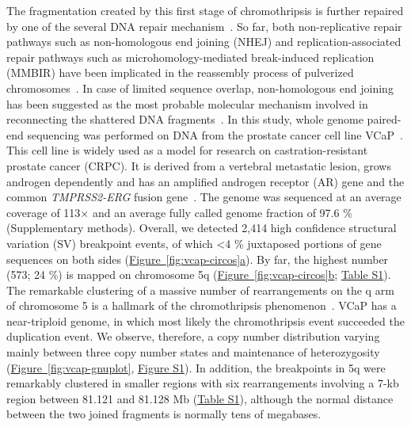 The fragmentation created by this first stage of chromothripsis is further repaired by one of the several DNA repair mechanism~\cite{holland2012chromoanagenesis}.
So far, both non-replicative repair pathways such as non-homologous end joining (NHEJ) and replication-associated repair pathways such as microhomology-mediated
break-induced replication (MMBIR) have been implicated in the reassembly process of pulverized chromosomes~\cite{forment2012chromothripsis}. In case of limited sequence
overlap, non-homologous end joining has been suggested as the most probable molecular mechanism involved in reconnecting the shattered DNA fragments~\cite{rausch2012genome}.
In this study, whole genome paired-end sequencing was performed on DNA from the prostate cancer cell line VCaP~\cite{drmanac2010human}. This cell line is widely
used as a model for research on castration-resistant prostate cancer (CRPC). It is derived from a vertebral metastatic lesion, grows androgen dependently and
has an amplified androgen receptor (AR) gene and the common \textit{TMPRSS2-ERG} fusion gene~\cite{korenchuk2001vcap}. The genome was sequenced at an average coverage
of 113× and an average fully called genome fraction of 97.6 \% (Supplementary methods). Overall, we detected 2,414 high confidence structural variation (SV)
breakpoint events, of which <4 \% juxtaposed portions of gene sequences on both sides (\hyperref[fig:vcap-circos]{Figure~\ref*{fig:vcap-circos}a}). By far, the highest number (573; 24 \%) is
 mapped on chromosome 5q (\hyperref[fig:vcap-circos]{Figure~\ref*{fig:vcap-circos}b}; \href{https://link.springer.com/article/10.1007/s00439-013-1308-1#SupplementaryMaterial}{Table S1}). The remarkable clustering of a massive number of rearrangements on the q arm of chromosome 5 is
a hallmark of the chromothripsis phenomenon~\cite{forment2012chromothripsis}. VCaP has a near-triploid genome, in which most likely the chromothripsis event succeeded
the duplication event. We observe, therefore, a copy number distribution varying mainly between three copy number states and maintenance of heterozygosity
(\hyperref[vcap-gnuplot]{Figure~\ref*{fig:vcap-gnuplot}}, \href{https://link.springer.com/article/10.1007/s00439-013-1308-1#SupplementaryMaterial}{Figure S1}). In addition, the breakpoints in 5q were remarkably clustered in smaller regions with six rearrangements involving a 7-kb
region between 81.121 and 81.128 Mb (\href{https://link.springer.com/article/10.1007/s00439-013-1308-1#SupplementaryMaterial}{Table S1}), although the normal distance between the two joined fragments is normally tens of megabases.

